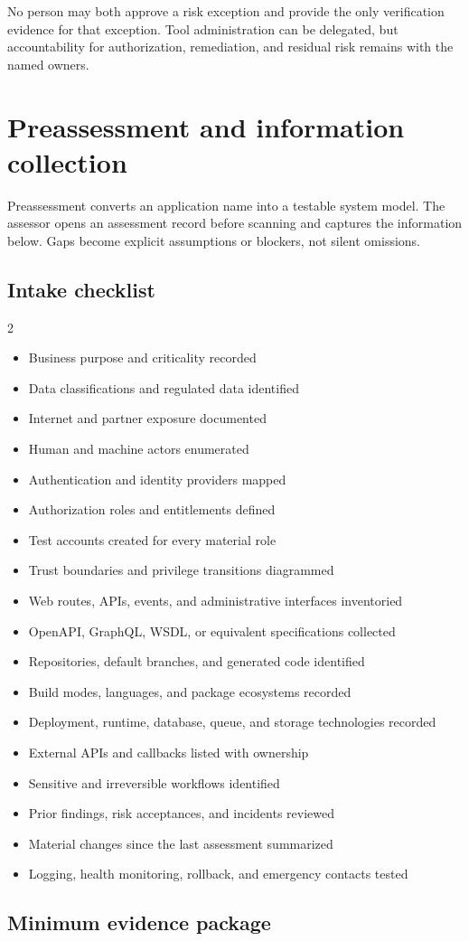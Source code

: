 \documentclass[11pt,letterpaper]{article}
\newcommand{\checkitem}{\item[$\square$]}
\begin{document}
No person may both approve a risk exception and provide the only verification evidence for that exception. Tool administration can be delegated, but accountability for authorization, remediation, and residual risk remains with the named owners.

\section{Preassessment and information collection}

Preassessment converts an application name into a testable system model. The assessor opens an assessment record before scanning and captures the information below. Gaps become explicit assumptions or blockers, not silent omissions.

\subsection{Intake checklist}

\begin{multicols}{2}
\begin{itemize}
  \checkitem Business purpose and criticality recorded
  \checkitem Data classifications and regulated data identified
  \checkitem Internet and partner exposure documented
  \checkitem Human and machine actors enumerated
  \checkitem Authentication and identity providers mapped
  \checkitem Authorization roles and entitlements defined
  \checkitem Test accounts created for every material role
  \checkitem Trust boundaries and privilege transitions diagrammed
  \checkitem Web routes, APIs, events, and administrative interfaces inventoried
  \checkitem OpenAPI, GraphQL, WSDL, or equivalent specifications collected
  \checkitem Repositories, default branches, and generated code identified
  \checkitem Build modes, languages, and package ecosystems recorded
  \checkitem Deployment, runtime, database, queue, and storage technologies recorded
  \checkitem External APIs and callbacks listed with ownership
  \checkitem Sensitive and irreversible workflows identified
  \checkitem Prior findings, risk acceptances, and incidents reviewed
  \checkitem Material changes since the last assessment summarized
  \checkitem Logging, health monitoring, rollback, and emergency contacts tested
\end{itemize}
\end{multicols}

\subsection{Minimum evidence package}
\end{document}
